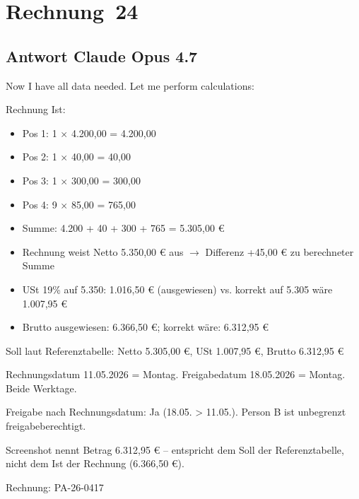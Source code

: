 
\clearpage
\section{Rechnung~24}
\label{anhang:modellantwort-24}

\subsection*{Antwort Claude Opus 4.7}

Now I have all data needed. Let me perform calculations:

Rechnung Ist:
\begin{itemize}
    \item Pos 1: 1 $\times$ 4.200,00 = 4.200,00
    \item Pos 2: 1 $\times$ 40,00 = 40,00
    \item Pos 3: 1 $\times$ 300,00 = 300,00
    \item Pos 4: 9 $\times$ 85,00 = 765,00
    \item Summe: 4.200 + 40 + 300 + 765 = 5.305,00 €
    \item Rechnung weist Netto 5.350,00 € aus $\rightarrow$ Differenz +45,00 € zu berechneter Summe
    \item USt 19\% auf 5.350: 1.016,50 € (ausgewiesen) vs. korrekt auf 5.305 wäre 1.007,95 €
    \item Brutto ausgewiesen: 6.366,50 €; korrekt wäre: 6.312,95 €
\end{itemize}

Soll laut Referenztabelle: Netto 5.305,00 €, USt 1.007,95 €, Brutto 6.312,95 €

Rechnungsdatum 11.05.2026 = Montag. Freigabedatum 18.05.2026 = Montag. Beide Werktage.

Freigabe nach Rechnungsdatum: Ja (18.05. \textgreater{} 11.05.). Person B ist unbegrenzt freigabeberechtigt.

Screenshot nennt Betrag 6.312,95 € -- entspricht dem Soll der Referenztabelle, nicht dem Ist der Rechnung (6.366,50 €).

{\RechnungKopfStil Rechnung: PA-26-0417 \textbar{} }\par

